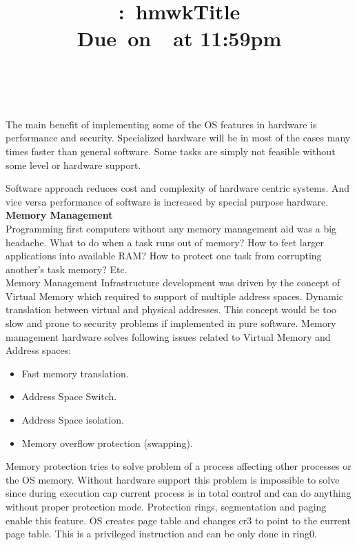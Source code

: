 \documentclass{article}
\title{
    \vspace{2in}
    \textmd{\textbf{\hmwkClass:\ hmwkTitle}}\\
    \normalsize\vspace{0.1in}\small{Due\ on\ \hmwkDueDate\ at 11:59pm}\\
    \vspace{0.1in}\large{\textit{\hmwkClassInstructor\ \hmwkClassTime}}
    \vspace{3in}
}
\author{\textbf{\hmwkAuthorName}}
\date{}
\begin{document}
\maketitle

\pagebreak


        \vspace{1cm}


        The main benefit of implementing some of the OS features in hardware is
        performance and security.
        Specialized hardware will be in most of the cases many times faster than general
        software. Some tasks are simply not feasible without some level or hardware
        support. 

        Software approach reduces cost and complexity of hardware centric systems. And
        vice versa performance of software is increased by special purpose hardware.\\

        \textbf{Memory Management}\\

        Programming first computers without any memory management aid was a big headache.
        What to do when a task runs out of memory? How to feet larger applications into
        available RAM? How to protect one task from corrupting another's task memory? Etc.\\

        Memory Management Infrastructure development was driven by the 
        concept of Virtual Memory which required to support of multiple address spaces.
        Dynamic translation between virtual and physical addresses. This concept would be
        too slow and prone to security problems if implemented in pure software. 
        Memory management hardware solves following issues related to Virtual Memory and
        Address spaces:
        \begin{itemize}
            \item Fast memory translation.
            \item Address Space Switch.
            \item Address Space isolation.
            \item Memory overflow protection (swapping).
        \end{itemize}

        Memory protection tries to solve problem of a process affecting other processes or the OS
        memory. Without hardware support this problem is impossible to solve since during  execution
        cap current process is in total control and can do anything without proper protection
        mode. Protection rings, segmentation and paging enable this feature.
        OS creates page table and changes cr3 to point to the current page table. This is
        a privileged instruction and can be only done in ring0. \\
\end{document}
